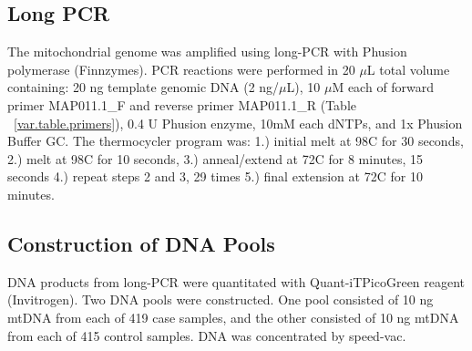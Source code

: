 \subsection{Long PCR}\label{var.methods.long_pcr}
The mitochondrial genome was amplified using long-PCR with Phusion polymerase (Finnzymes).  PCR reactions were performed in 20 $\mu$L total volume containing: 20 ng template genomic DNA (2 ng/$\mu$L), 10 $\mu$M each of forward primer MAP011.1\_F and reverse primer MAP011.1\_R (Table ~\ref{var.table.primers}), 0.4 U Phusion enzyme, 10mM each dNTPs, and 1x Phusion Buffer GC.  The thermocycler program was: 1.) initial melt at 98\textdegree C for 30 seconds, 2.) melt at 98\textdegree C for 10 seconds, 3.) anneal/extend at  72\textdegree C for 8 minutes, 15 seconds 4.) repeat steps 2 and 3, 29 times 5.) final extension at 72\textdegree C for 10 minutes.

\begin{table}[htbp]
\begin{minipage}{\textwidth}
\caption[List of PCR Primers]{PCR primers used for Sanger sequencing and long-PCR.}
\label{var.table.primers}
\noindent{}
\end{minipage}
\end{table}

\subsection{Construction of DNA Pools}\label{var.methods.pools}
DNA products from long-PCR were quantitated with Quant-iT\texttrademark PicoGreen\textsuperscript{\textregistered} reagent (Invitrogen).  Two DNA pools were constructed. One pool consisted of 10 ng mtDNA from each of 419 case samples, and the other consisted of 10 ng mtDNA from each of 415 control samples.  DNA was concentrated by speed-vac.

